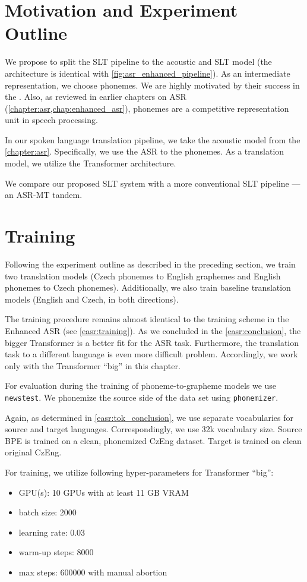 \section{Motivation and Experiment Outline}
\label{slt:outline}
We propose to split the SLT pipeline to the acoustic and SLT model (the architecture is identical with \cref{fig:asr_enhanced_pipeline}). As an intermediate representation, we choose phonemes. We are highly motivated by their success in the . Also, as reviewed in earlier chapters on ASR (\cref{chapter:asr,chap:enhanced_asr}), phonemes are a competitive representation unit in speech processing.  

In our spoken language translation pipeline, we take the acoustic model from the \cref{chapter:asr}. Specifically, we use the ASR to the phonemes. As a translation model, we utilize the Transformer architecture.

We compare our proposed SLT system with a more conventional SLT pipeline --- an ASR-MT tandem.

\section{Training}
\label{slt:training}
Following the experiment outline as described in the preceding section, we train two translation models (Czech phonemes to English graphemes and English phonemes to Czech phonemes). Additionally, we also train baseline translation models (English and Czech, in both directions). 

The training procedure remains almost identical to the training scheme in the Enhanced ASR (see \cref{easr:training}). As we concluded in the \cref{easr:conclusion}, the bigger Transformer is a better fit for the ASR task. Furthermore, the translation task to a different language is even more difficult problem. Accordingly, we work only with the Transformer ``big'' in this chapter.

For evaluation during the training of phoneme-to-grapheme models we use \texttt{news\-test}. We phonemize the source side of the data set using \texttt{phonemizer}.

Again, as determined in \cref{easr:tok_conclusion}, we use separate vocabularies for source and target languages. Correspondingly, we use 32k vocabulary size. Source BPE is trained on a clean, phonemized CzEng dataset. Target is trained on clean original CzEng.

For training, we utilize following hyper-parameters for Transformer ``big'':
\begin{itemize}
	\item GPU(s): 10 GPUs with at least 11 GB VRAM
	\item batch size: 2000
	\item learning rate: 0.03
	\item warm-up steps: 8000
	\item max steps: 600000 with manual abortion
\end{itemize}

